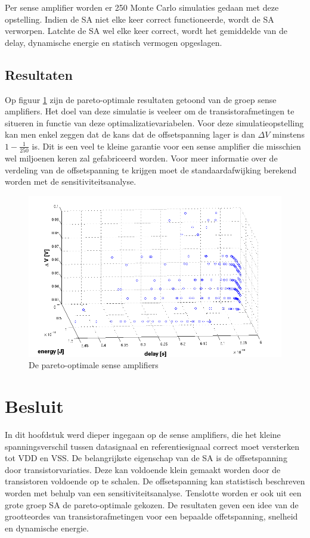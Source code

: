 Per sense amplifier worden er 250 Monte Carlo simulaties gedaan met deze opstelling. Indien de SA niet elke keer correct functioneerde, wordt de SA verworpen. Latchte de SA wel elke keer correct, wordt het gemiddelde van de delay, dynamische energie  en statisch vermogen opgeslagen. 

\subsection{Resultaten}
Op figuur \ref{fig:pareto} zijn de pareto-optimale resultaten getoond van de groep sense amplifiers. Het doel van deze simulatie is veeleer om de transistorafmetingen te situeren in functie van deze optimalizatievariabelen. Voor deze simulatieopstelling kan men enkel zeggen dat de kans dat de offsetspanning lager is dan $\Delta V$ minstens $1 -\frac{1}{250}$ is. Dit is een veel te kleine garantie voor een sense amplifier die misschien wel miljoenen keren zal gefabriceerd worden. Voor meer informatie over de verdeling van de offsetspanning te krijgen moet de standaardafwijking berekend worden met de sensitiviteitsanalyse.

\begin{figure}
  \centering
  \includegraphics[scale=0.4]{../fig/hfdstk-sensamp-pareto.png}
  \caption{De pareto-optimale sense amplifiers}
  \label{fig:pareto}
\end{figure}

\section{Besluit}
In dit hoofdstuk werd dieper ingegaan op de sense amplifiers, die het kleine spanningsverschil tussen datasignaal en referentiesignaal correct moet versterken tot VDD en VSS. De belangrijkste eigenschap van de SA is de offsetspanning door transistorvariaties. Deze kan voldoende klein gemaakt worden door de transistoren voldoende op te schalen. De offsetspanning kan statistisch beschreven worden met behulp van een sensitiviteitsanalyse. Tenslotte worden er ook uit een grote groep SA de pareto-optimale gekozen. De resultaten geven een idee van de grootteordes van transistorafmetingen voor een bepaalde offetspanning, snelheid en dynamische energie.
